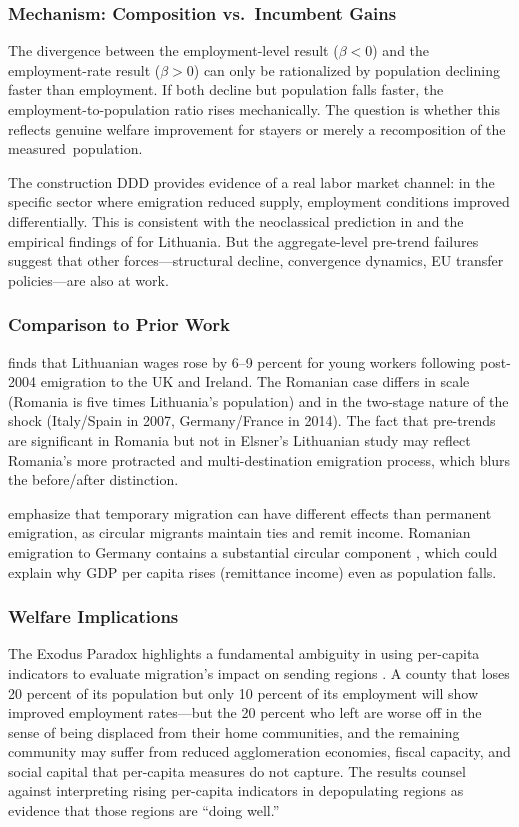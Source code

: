 \documentclass[12pt]{article}
\begin{document}
\subsubsection*{Mechanism: Composition vs.\ Incumbent Gains}
The divergence between the employment-level result ($\beta < 0$) and the employment-rate result ($\beta > 0$) can only be rationalized by population declining faster than employment. If both decline but population falls faster, the employment-to-population ratio rises mechanically. The question is whether this reflects genuine welfare improvement for stayers or merely a recomposition of the measured~population.

The construction DDD provides evidence of a real labor market channel: in the specific sector where emigration reduced supply, employment conditions improved differentially. This is consistent with the neoclassical prediction in \citet{borjas2003labor} and the empirical findings of \citet{elsner2013emigration} for Lithuania. But the aggregate-level pre-trend failures suggest that other forces---structural decline, convergence dynamics, EU transfer policies---are also at work.

\subsubsection*{Comparison to Prior Work} \citet{elsner2013emigration} finds that Lithuanian wages rose by 6--9 percent for young workers following post-2004 emigration to the UK and Ireland. The Romanian case differs in scale (Romania is five times Lithuania's population) and in the two-stage nature of the shock (Italy/Spain in 2007, Germany/France in 2014). The fact that pre-trends are significant in Romania but not in Elsner's Lithuanian study may reflect Romania's more protracted and multi-destination emigration process, which blurs the before/after distinction.

\citet{dustmann2015economics} emphasize that temporary migration can have different effects than permanent emigration, as circular migrants maintain ties and remit income. Romanian emigration to Germany contains a substantial circular component \citep{sandu2010romania}, which could explain why GDP per capita rises (remittance income) even as population falls.

\subsubsection*{Welfare Implications} The Exodus Paradox highlights a fundamental ambiguity in using per-capita indicators to evaluate migration's impact on sending regions \citep{cattaneo2015effects}. A county that loses 20 percent of its population but only 10 percent of its employment will show improved employment rates---but the 20 percent who left are worse off in the sense of being displaced from their home communities, and the remaining community may suffer from reduced agglomeration economies, fiscal capacity, and social capital that per-capita measures do not capture. The results counsel against interpreting rising per-capita indicators in depopulating regions as evidence that those regions are ``doing well.''
\end{document}
